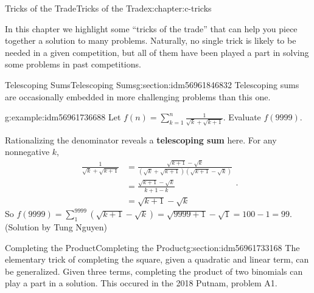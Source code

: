 \documentclass[twoside,10pt,]{book}
\newcommand{\terminology}[1]{\textbf{#1}}
\numberwithin{equation}{section}
\begin{document}
\begin{chapterptx}{Tricks of the Trade}{}{Tricks of the Trade}{}{}{x:chapter:c-tricks}
\begin{introduction}{}%
In this chapter we highlight some ``tricks of the trade'' that can help you piece together a solution to many problems.  Naturally, no single trick is likely to be needed in a given competition, but all of them have been played a part in solving some problems in past competitions.%
\end{introduction}%
%
%
\typeout{************************************************}
\typeout{************************************************}
%
\begin{sectionptx}{Telescoping Sums}{}{Telescoping Sums}{}{}{g:section:idm56961846832}
%
Telescoping sums are occasionally embedded in more challenging problems than this one.%
\begin{example}{}{g:example:idm56961736688}%
Let \(f(n)=\sum_{k=1}^n \frac{1}{\sqrt{k}+\sqrt{k+1}}\).  Evaluate \(f(9999)\).%
\par
Rationalizing the denominator reveals a \terminology{telescoping sum} here.  For any nonnegative \(k\),%
\begin{equation*}
\begin{split}
\frac{1}{\sqrt{k} + \sqrt{k + 1}} & = \frac{\sqrt{k + 1} - \sqrt{k}}{(\sqrt{k} + \sqrt{k + 1})(\sqrt{k + 1} - \sqrt{k})}\\ 
&= \frac{\sqrt{k + 1} - \sqrt{k}}{k + 1 - k}\\
&= \sqrt{k + 1} - \sqrt{k}
\end{split}\text{.}
\end{equation*}
So \(f(9999) = \sum_{1}^{9999}(\sqrt{k + 1} - \sqrt{k}) = \sqrt{9999 + 1} - \sqrt{1} = 100 - 1 = 99\).  (Solution by Tung Nguyen)%
\end{example}
\end{sectionptx}
%
%
\typeout{************************************************}
\typeout{************************************************}
%
\begin{sectionptx}{Completing the Product}{}{Completing the Product}{}{}{g:section:idm56961733168}
The elementary trick of completing the square, given a quadratic and linear term, can be generalized.  Given three terms, completing the product of two binomials can play a part in a solution.  This occured in the 2018 Putnam, problem A1.%
\begin{quote}%

\end{quote}
\end{sectionptx}
\end{chapterptx}
\end{document}
